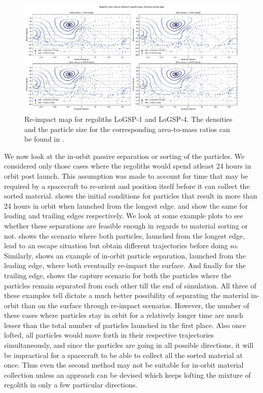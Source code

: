 \FloatBarrier
\begin{figure}[htb]
\centering
\captionsetup{justification=centering}
\includegraphics[angle=90, width=\textwidth, height=\textheight, keepaspectratio=true]{asteroid_mining/trailingEdge_crashMap.pdf}
\caption{Re-impact map for regoliths LoGSP-1 and LoGSP-4. The densities and the particle size for the corresponding area-to-mass ratios can be found in .}
\label{fig:trailingEdge_crashmap_sorting}
\end{figure}
\FloatBarrier
We now look at the in-orbit passive separation or sorting of the particles. We considered only those cases where the regoliths would spend atleast 24 hours in orbit post launch. This assumption was made to account for time that may be required by a spacecraft to re-orient and position itself before it can collect the sorted material.  shows the initial conditions for particles that result in more than 24 hours in orbit when launched from the longest edge.  and  show the same for leading and trailing edges respectively. We look at some example plots to see whether these separations are feasible enough in regards to material sorting or not.  shows the scenario where both particles, launched from the longest edge, lead to an escape situation but obtain different trajectories before doing so. Similarly,  shows an example of in-orbit particle separation, launched from the leading edge, where both eventually re-impact the surface. And finally for the trailing edge,  shows the capture scenario for both the particles where the particles remain separated from each other till the end of simulation. All three of these examples tell dictate a much better possibility of separating the material in-orbit than on the surface through re-impact scenarios. However, the number of these cases where particles stay in orbit for a relatively longer time are much lesser than the total number of particles launched in the first place. Also once lofted, all particles would move forth in their respective trajectories simultaneously, and since the particles are going in all possible directions, it will be impractical for a spacecraft to be able to collect all the sorted material at once. Thus even the second method may not be suitable for in-orbit material collection unless an approach can be devised which keeps lofting the mixture of regolith in only a few particular directions.
